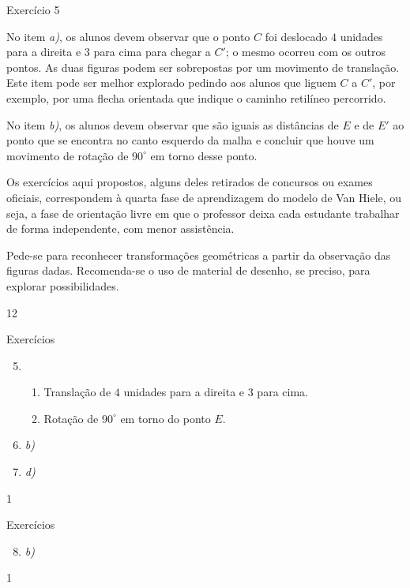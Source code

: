 \begin{sugestions}{Exercício 5}
{
No item \textit{a)}, os alunos devem observar que o ponto $C$ foi deslocado $4$ unidades para a direita e $3$ para cima para chegar a $C'$; o mesmo ocorreu com os outros pontos. As duas figuras podem ser sobrepostas por um movimento de translação. Este item pode ser melhor explorado pedindo aos alunos que liguem $C$ a $C'$, por exemplo, por uma flecha orientada que indique o caminho retilíneo percorrido.

No item \textit{b)}, os alunos devem observar que são iguais as distâncias de $E$ e de $E'$ ao ponto que se encontra no canto esquerdo da malha e concluir que houve um movimento de rotação de $90^{\circ}$ em torno desse ponto. 



Os exercícios aqui propostos, alguns deles retirados de concursos ou exames oficiais, correspondem à quarta fase de aprendizagem do modelo de Van Hiele, ou seja, a fase de orientação livre em que o professor deixa cada estudante trabalhar de forma independente, com menor assistência.

Pede-se para reconhecer transformações geométricas a partir da observação das figuras dadas. Recomenda-se o uso de material de desenho, se preciso, para explorar possibilidades. 
}{1}{2}
\end{sugestions}
\begin{answer}{Exercícios}
{\exerciselist
\begin{enumerate}\setcounter{enumi}{4}
\item 
\begin{enumerate}
\item Translação de $4$ unidades para a direita e $3$ para cima.
\item Rotação de $90^{\circ}$ em torno do ponto $E$.
\end{enumerate}

\item \textit{b)}

\item \textit{d)}
\end{enumerate}
}{1}
\end{answer}
\clearmargin
\clearmargin
\begin{answer}{Exercícios}
{\exerciselist
\begin{enumerate}\setcounter{enumi}{7}
\item \textit{b)}
\end{enumerate}
}{1}
\end{answer}
